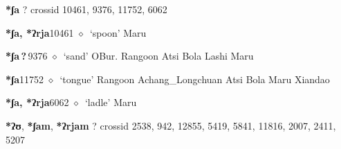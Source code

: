 \item
\textbf{*ʃa}
?
  {\tiny crossid 10461, 9376, 11752, 6062}
  \begin{list}{}{\leftmargin=1.5em \itemindent=-1.5em}
  \item {\footnotesize \textbf{*ʃa, *ʔrja}}{\tiny 10461}
         $\diamond$~`spoon'
         Maru 
  \item {\footnotesize \textbf{*ʃa\,?\,}}{\tiny 9376}
\hspace{1ex}
         $\diamond$~`sand'
         OBur. 
\hspace{1ex}
         Rangoon 
\hspace{1ex}
         Atsi 
\hspace{1ex}
         Bola 
\hspace{1ex}
         Lashi 
\hspace{1ex}
         Maru 
  \item {\footnotesize \textbf{*ʃa}}{\tiny 11752}
\hspace{1ex}
         $\diamond$~`tongue'
         Rangoon 
\hspace{1ex}
         Achang\_Longchuan 
\hspace{1ex}
         Atsi 
\hspace{1ex}
         Bola 
\hspace{1ex}
         Maru 
\hspace{1ex}
         Xiandao 
  \item {\footnotesize \textbf{*ʃa, *ʔrja}}{\tiny 6062}
\hspace{1ex}
         $\diamond$~`ladle'
         Maru 
  \end{list}
\item
\textbf{*ʔʊ}, \textbf{*ʃam}, \textbf{*ʔrjam}
?
  {\tiny crossid 2538, 942, 12855, 5419, 5841, 11816, 2007, 2411, 5207}
